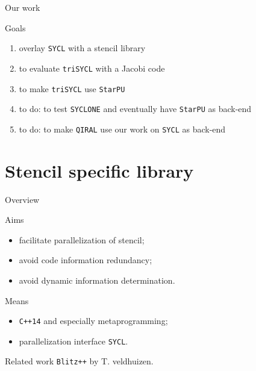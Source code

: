 \documentclass[10pt, compress]{beamer}
\begin{document}
\begin{frame}{Our work}

\begin{block}{Goals}
\begin{enumerate}
\item \large{overlay \texttt{SYCL} with a stencil library}
\item \large{to evaluate \texttt{triSYCL} with a Jacobi code}
\item \large{to make \texttt{triSYCL} use \texttt{StarPU}}
\item \normalsize{\alert{to do:} to test \texttt{SYCLONE} and eventually have \texttt{StarPU} as back-end}
\item \normalsize{\alert{to do:} to make \texttt{QIRAL} use our work on \texttt{SYCL} as back-end}
\end{enumerate}
\end{block}

\end{frame}


\section{Stencil specific library}

\begin{frame}{Overview}

\begin{block}{Aims}
\begin{itemize}
\item facilitate parallelization of stencil;
\item avoid code information redundancy;
\item avoid dynamic information determination.
\end{itemize}
\end{block}

\begin{block}{Means}
\begin{itemize}
\item \texttt{C++14} and especially metaprogramming;
\item parallelization interface \texttt{SYCL}.
\end{itemize}
\end{block}

\begin{block}{Related work}
\texttt{Blitz++} by T. veldhuizen.
\end{block}

\end{frame}
\end{document}
